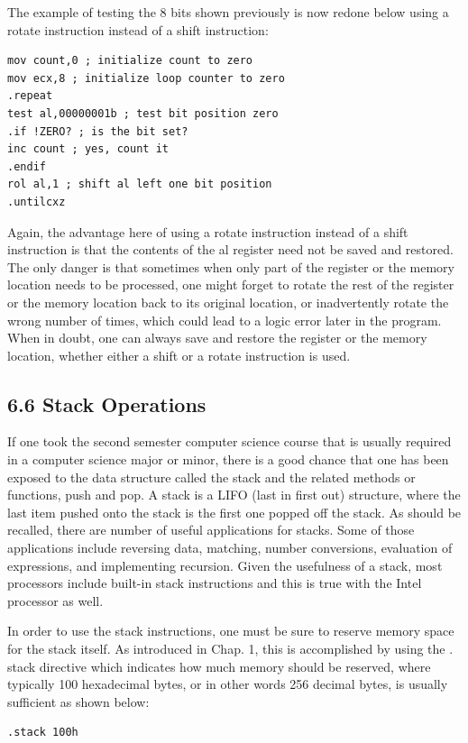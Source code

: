\documentclass[10pt]{book}
\begin{document}
The example of testing the 8 bits shown previously is now redone below using a rotate instruction instead of a shift instruction:

\begin{verbatim}
mov count,0 ; initialize count to zero
mov ecx,8 ; initialize loop counter to zero
.repeat
test al,00000001b ; test bit position zero
.if !ZERO? ; is the bit set?
inc count ; yes, count it
.endif
rol al,1 ; shift al left one bit position
.untilcxz
\end{verbatim}

Again, the advantage here of using a rotate instruction instead of a shift instruction is that the contents of the al register need not be saved and restored. The only danger is that sometimes when only part of the register or the memory location needs to be processed, one might forget to rotate the rest of the register or the memory location back to its original location, or inadvertently rotate the wrong number of times, which could lead to a logic error later in the program. When in doubt, one can always save and restore the register or the memory location, whether either a shift or a rotate instruction is used.

\subsection*{6.6 Stack Operations}
If one took the second semester computer science course that is usually required in a computer science major or minor, there is a good chance that one has been exposed to the data structure called the stack and the related methods or functions, push and pop. A stack is a LIFO (last in first out) structure, where the last item pushed onto the stack is the first one popped off the stack. As should be recalled, there are number of useful applications for stacks. Some of those applications include reversing data, matching, number conversions, evaluation of expressions, and implementing recursion. Given the usefulness of a stack, most processors include built-in stack instructions and this is true with the Intel processor as well.

In order to use the stack instructions, one must be sure to reserve memory space for the stack itself. As introduced in Chap. 1, this is accomplished by using the . stack directive which indicates how much memory should be reserved, where typically 100 hexadecimal bytes, or in other words 256 decimal bytes, is usually sufficient as shown below:

\begin{verbatim}
.stack 100h
\end{verbatim}
\end{document}
